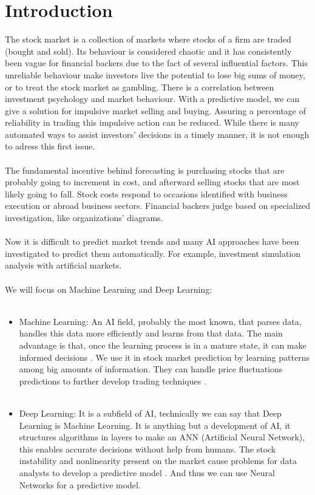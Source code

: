 \documentclass[conference]{IEEEtran}
\begin{document}
\section{Introduction}
The stock market is a collection of markets where stocks of a firm are traded (bought and sold)\cite{M2018}.
Its behaviour is considered chaotic \cite{Singh2016} and it has consistently been vague for financial backers
due to the fact of several influential factors. This unreliable behaviour make investors live the potential to lose big sums of money, or to treat
the stock market as gambling. There is a correlation between investment psychology and market behaviour. With a predictive model, we can give a 
solution for impulsive market selling and buying. Assuring a percentage of reliability in trading this impulsive action can be reduced. While there is many automated ways to assist investors' decisions
in a timely manner\cite{nabipour2020predicting}, it is not enough to adress this first issue.
\\\\
The fundamental incentive behind forecasting is purchasing stocks that are probably going to increment in cost, and afterward selling stocks that are most likely going to fall\cite{nabipour2020predicting}. 
Stock costs respond to occasions identified with business execution or abroad business sectors. Financial backers judge based on specialized investigation, like organizations' diagrams\cite{Akita2016}.
\\\\
Now it is difficult to predict market trends and many AI approaches
have been investigated to predict them automatically. For example, investment simulation analysis with artificial
 markets\cite{Akita2016}.
\\\\
We will focus on Machine Learning and Deep Learning:
\\\\
\begin{itemize}
  \item Machine Learning: An AI field, probably the most known, that parses data, handles this data more efficiently and learns from that data. The main advantage is that, once
  the learning process is in a mature state, it can make informed decisions \cite{dey2016machine}. We use it in stock market prediction by learning patterns among big amounts of information.
  They can handle price fluctuations predictions to further develop trading techniques \cite{nabipour2020predicting}.
  \\\\
  \item Deep Learning: It is a subfield of AI, technically we can say that Deep Learning is Machine Learning.
  It is anything but a development of AI, it structures algorithms in layers to make an ANN (Artificial Neural Network), this enables accurate decisions
  without help from humans. The stock instability and nonlinearity present on the market cause problems for data analysts to develop a predictive model \cite{nabipour2020predicting}. And thus we can use Neural Networks for a predictive model.
\end{itemize}
\end{document}
